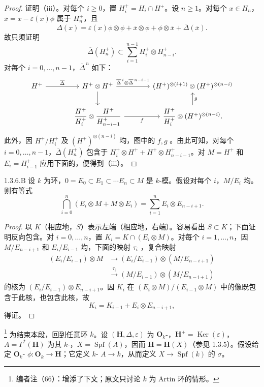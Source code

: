 \begin{proof}
证明（iii）。对每个 $i\geq0$，置 $H_i^+=H_i\cap H^+$。设 $n\geq1$。对每个 $x\in H_n$，$\overline x=x-\varepsilon(x)\phi$ 属于 $H_n^+$，且
\[
 \Delta(x)=\varepsilon(x)\phi\otimes\phi+\overline x\otimes\phi+\phi\otimes\overline x+\overline\Delta(\overline x).
\]
故只须证明
\[
 \overline\Delta(H_n^+)\subset\sum_{i=1}^{n-1}H_i^+\otimes H_{n-i}^+.
\]
对每个 $i=0,\ldots,n-1$，$\overline\Delta^{\,n}$ 如下：
\[
\begin{tikzcd}[column sep=large]
 H^+\arrow[r,"\overline\Delta"]&H^+\otimes H^+\arrow[r,"{\overline\Delta^{\,i}\otimes\overline\Delta^{\,n-i-1}}"]\arrow[d]
 &(H^+)^{\otimes(i+1)}\otimes(H^+)^{\otimes(n-i)}\\
 &\dfrac{H^+}{H_i^+}\otimes\dfrac{H^+}{H_{n-i-1}^+}\arrow[r,"f"']
 &\dfrac{H^+}{H_i^+}\otimes(H^+)^{\otimes(n-i)}\arrow[u,"g"'].
\end{tikzcd}
\]
此外，因 $H^+/H_i^+$ 及 $(H^+)^{\otimes(n-i)}$ 均，图中的 $f,g$ 。由此可知，对每个 $i=0,\ldots,n-1$，$\overline\Delta(H_n^+)$ 包含于 $H_i^+\otimes H^++H^+\otimes H_{n-i-1}^+$。对 $M=H^+$ 和 $E_i=H_{i-1}^+$ 应用下面的，便得到（iii）。
\end{proof}
\begin{SGAresult}{}{1.3.6.B}
设 $k$ 为环，$0=E_0\subset E_1\subset\cdots E_n\subset M$ 是 $k$-模。假设对每个 $i$，$M/E_i$ 均。则有等式
\[
 \bigcap_{i=0}^n(E_i\otimes M+M\otimes E_i)=\sum_{i=1}^n E_i\otimes E_{n-i+1}.
\]
\end{SGAresult}
\begin{proof}
以 $K$（相应地，$S$）表示左端（相应地，右端）。容易看出 $S\subset K$；下面证明反向包含。对 $i=0,\ldots,n$，置 $K_i=K\cap(E_i\otimes M)$。对每个 $i=1,\ldots,n$，因 $M/E_{n-i+1}$ 和 $E_i/E_{i-1}$ 均，下面的映射 $\tau_i$ ，复合映射
\[
\begin{split}
 (E_i/E_{i-1})\otimes M&\longrightarrow(E_i/E_{i-1})\otimes(M/E_{n-i+1})\\
 &\xrightarrow{\ \tau_i\ }(M/E_{i-1})\otimes(M/E_{n-i+1})
\end{split}
\]
的核为 $(E_i/E_{i-1})\otimes E_{n-i+1}$。因 $K_i$ 在 $(E_i\otimes M)/(E_{i-1}\otimes M)$ 中的像既包含于此核，也包含此核，故
\[
 K_i=K_{i-1}+E_i\otimes E_{n-i+1},
\]
得证。
\end{proof}
\footnote{编者注（66）：增添了下文；原文只讨论 $k$ 为 Artin 环的情形。} 为结束本段，回到任意环 $k$。设 $(\mathbf H,\Delta,\varepsilon)$ 为 $\mathbf O_k$-，$\mathbf H^+=\operatorname{Ker}(\varepsilon)$，$A=\Gamma^*(\mathbf H)$ 为其 $k$-，$X=\operatorname{Spf}(A)$，因而 $\mathbf H=\mathbf H(X)$（参见 1.3.5）。假设给定 $\mathbf O_k$- $\phi:\mathbf O_k\to\mathbf H$；它定义 $k$- $A\to k$，从而定义 $X\to\operatorname{Spf}(k)$ 的 $\sigma$。

